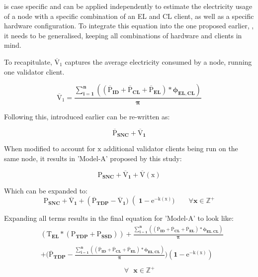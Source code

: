  is case specific and can be applied independently to estimate the electricity usage of a node with a specific combination of an EL and CL client, as well as a specific hardware configuration. To integrate this equation into the one proposed earlier, , it needs to be generalised, keeping all combinations of hardware and clients in mind.

To recapitulate, $\boldsymbol{\mathrm{\overline{V}_{1}}}$ captures the average electricity consumed by a node, running one validator client. 

\begin{equation*}
    \boldsymbol{\mathrm{\overline{V}_{1}} = {\frac{\displaystyle\sum\limits_{i=1}^{n}{ \left({\left(\mathrm{\overline{P}}_{ID} + \mathrm{\overline{P}}_{CL} + \mathrm{\overline{P}}_{EL}\right)} * {\phi_{EL,CL}} \right)}}
{\pi}} }
\end{equation*}

Following this,  introduced earlier can be re-written as:

\begin{equation*}
     \boldsymbol{\overline{\mathrm{P}}_{SNC} +  \overline{\mathrm{V}}_{1} 
} 
\end{equation*}

When modified to account for $\boldsymbol{\mathrm{x }}$ additional validator clients being run on the same node, it results in 'Model-A' proposed by this study: 

\begin{equation}
\label{eqn:FinalEqnShort}
     \boldsymbol{\mathrm{P}_{SNC} +  \overline{\mathrm{V}}_{1} + \mathrm{\overline{V}(\mathrm{x})}} 
\end{equation}

Which can be expanded to:
\begin{equation*}
     \boldsymbol{\mathrm{P}_{SNC} +  \overline{\mathrm{V}}_{1} + {\left(\mathrm{\overline{P}}_{TDP} -\overline{\mathrm{V}}_{1} )\right(1-\mathrm{e}^{-\mathrm{k}(\mathrm{x})}) \qquad \forall x \in \mathbb{Z}^+}} 
\end{equation*}

Expanding all terms results in the final equation for 'Model-A' to look like:
\begin{align}
\label{eqn:FinalEqnLong}
     &\boldsymbol{({\mathrm{T}_{EL} * ({\mathrm{P}_{TDP}} + \mathrm{P}_{SSD})}) +  {\frac{\displaystyle\sum\limits_{i=1}^{n}{ \left({\left(\mathrm{\overline{P}}_{ID} + \mathrm{\overline{P}}_{CL} + \mathrm{\overline{P}}_{EL}\right)} * {\phi_{EL,CL}} \right)}}
{\pi}}}\nonumber \\  \nonumber\\  
     &\boldsymbol{+ {(\mathrm{\overline{P}}_{TDP} - {\frac{\displaystyle\sum\limits_{i=1}^{n}{ \left({\left(\mathrm{\overline{P}}_{ID} + \mathrm{\overline{P}}_{CL} + \mathrm{\overline{P}}_{EL}\right)} * {\phi_{EL,CL}} \right)}}
{\pi}}} ) (1-\mathrm{e}^{-\mathrm{k}(\mathrm{x})})}\\ \nonumber \\    
     &\boldsymbol{\qquad \qquad \qquad \qquad \qquad \qquad \forall \text{ } x \in \mathbb{Z}^+}\nonumber 
\end{align}

